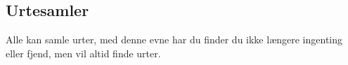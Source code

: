 \subsection*{Urtesamler}
Alle kan samle urter, med denne evne har du finder du ikke længere ingenting eller fjend, men vil altid finde urter.